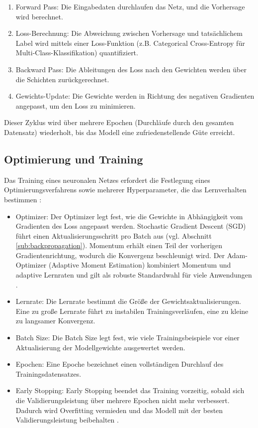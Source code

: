 \begin{enumerate}
    \item Forward Pass: Die Eingabedaten durchlaufen das Netz, und die Vorhersage wird berechnet.
    \item Loss-Berechnung: Die Abweichung zwischen Vorhersage und tatsächlichem Label wird mittels einer Loss-Funktion (z.B. Categorical Cross-Entropy für Multi-Class-Klassifikation) quantifiziert.
    \item Backward Pass: Die Ableitungen des Loss nach den Gewichten werden über die Schichten zurückgerechnet.
    \item Gewichts-Update: Die Gewichte werden in Richtung des negativen Gradienten angepasst, um den Loss zu minimieren.
\end{enumerate}

Dieser Zyklus wird über mehrere Epochen (Durchläufe durch den gesamten Datensatz) wiederholt, bis das Modell eine zufriedenstellende Güte erreicht.

\subsection{Optimierung und Training}\label{sub:optimierung-training}

Das Training eines neuronalen Netzes erfordert die Festlegung eines Optimierungsverfahrens sowie mehrerer Hyperparameter, die das Lernverhalten bestimmen \cite[S. ~1]{a.g.TuningHyperparameterADAM2026}:

\begin{itemize}
    \item Optimizer: Der Optimizer legt fest, wie die Gewichte in Abhängigkeit vom Gradienten des Loss angepasst werden. Stochastic Gradient Descent (SGD) führt einen Aktualisierungsschritt pro Batch aus (vgl. Abschnitt \ref{sub:backpropagation}). Momentum erhält einen Teil der vorherigen Gradientenrichtung, wodurch die Konvergenz beschleunigt wird. Der Adam-Optimizer (Adaptive Moment Estimation) kombiniert Momentum und adaptive Lernraten und gilt als robuste Standardwahl für viele Anwendungen \cite[S. ~2]{a.g.TuningHyperparameterADAM2026}.
    \item Lernrate: Die Lernrate bestimmt die Größe der Gewichtsaktualisierungen. Eine zu große Lernrate führt zu instabilen Trainingsverläufen, eine zu kleine zu langsamer Konvergenz.
    \item Batch Size: Die Batch Size legt fest, wie viele Trainingsbeispiele vor einer Aktualisierung der Modellgewichte ausgewertet werden.
    \item Epochen: Eine Epoche bezeichnet einen vollständigen Durchlauf des Trainingsdatensatzes.
    \item Early Stopping: Early Stopping beendet das Training vorzeitig, sobald sich die Validierungsleistung über mehrere Epochen nicht mehr verbessert. Dadurch wird Overfitting vermieden und das Modell mit der besten Validierungsleistung beibehalten \cite[S. ~2]{yingOverviewOverfittingIts2019}.
\end{itemize}

